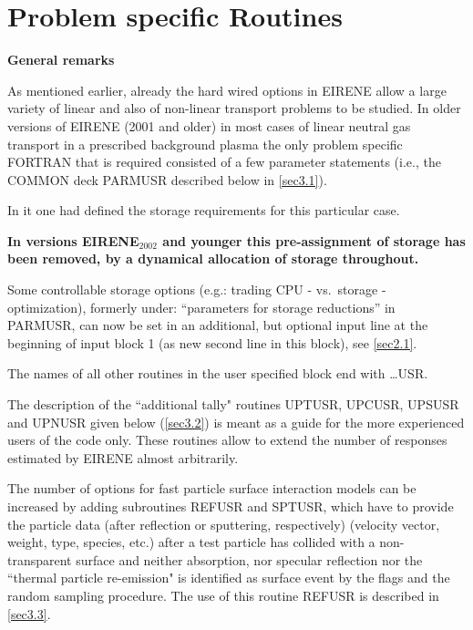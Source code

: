 \chapter{Problem specific Routines} \label{sec3}

\textbf{General remarks} 

\medskip 

As mentioned earlier, already the hard wired options in EIRENE allow a large
variety of linear and also of non-linear transport problems to be studied.
In older versions of EIRENE (2001 and older) in most cases of linear neutral
gas transport in a prescribed background plasma the only problem specific
FORTRAN that is required consisted of a few parameter statements (i.e., the
COMMON deck PARMUSR described below in \cref{sec3.1}).

In it one had defined the storage requirements for this particular case.

\textbf{In versions EIRENE$_{2002}$ and younger this pre-assignment of storage 
  has been removed, by a dynamical allocation of storage throughout.}

Some controllable storage options (e.g.: trading CPU - vs.\ storage -
optimization), formerly under: ``parameters for storage reductions'' in
PARMUSR, can now be set in an additional, but optional input line at the
beginning of input block 1 (as new second line in this block), see
\cref{sec2.1}.

\vspace{1em}

The names of all other routines in the user specified block end with \dots USR.

\smallskip

The description of the ``additional tally" routines UPTUSR, UPCUSR, UPSUSR and
UPNUSR given below (\cref{sec3.2}) is meant as a guide for the more experienced
users of the code only.
These routines allow to extend the number of responses estimated by EIRENE
almost arbitrarily.

The number of options for fast particle surface interaction models can be
increased by adding subroutines REFUSR and SPTUSR, which have to provide the
particle data (after reflection or sputtering, respectively) (velocity vector,
weight, type, species, etc.) after a test particle has collided with a
non-transparent surface and neither absorption, nor specular reflection nor the
``thermal particle re-emission" is identified as surface event by the flags and
the random sampling procedure.
The use of this routine REFUSR is described in \cref{sec3.3}.

